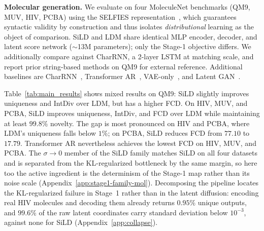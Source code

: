 \textbf{Molecular generation.}
We evaluate on four MoleculeNet benchmarks (QM9, MUV, HIV, PCBA) using the SELFIES representation~\cite{krenn2020self}, which guarantees syntactic validity by construction and thus isolates \emph{distributional} learning as the object of comparison. SiLD and LDM share identical MLP encoder, decoder, and latent score network ($\sim$13M parameters); only the Stage-1 objective differs. We additionally compare against CharRNN, a 2-layer LSTM at matching scale, and report prior string-based methods on QM9 for external reference. Additional baselines are
CharRNN~\citep{segler2018generating},
Transformer AR~\citep{wang2023cmolgpt,noutahi2024gotta},
VAE-only~\citep{gomez2018automatic}, and
Latent GAN~\citep{prykhodko2019novo}.

Table~\ref{tab:main_results} shows mixed results on QM9: SiLD slightly
improves uniqueness and IntDiv over LDM, but has a higher FCD. On HIV,
MUV, and PCBA, SiLD improves uniqueness, IntDiv, and FCD over LDM while
maintaining at least $99.8\%$ novelty. The gap is most pronounced on HIV
and PCBA, where LDM's uniqueness falls below $1\%$; on PCBA, SiLD reduces
FCD from $77.10$ to $17.79$. Transformer AR nevertheless achieves the
lowest FCD on HIV, MUV, and PCBA. The $\sigma\!\to\!0$ member of the SiLD
family matches SiLD on all four datasets and is separated from the
KL-regularized bottleneck by the same margin, so here too the active
ingredient is the determinism of the Stage-1 map rather than its noise scale
(Appendix~\ref{app:stage1-family-mol}). Decomposing the pipeline locates the
KL-regularized failure in Stage~1 rather than in the latent diffusion:
encoding real HIV molecules and decoding them already returns $0.95\%$ unique
outputs, and $99.6\%$ of the raw latent coordinates carry standard deviation
below $10^{-3}$, against none for SiLD (Appendix~\ref{app:collapse}).

